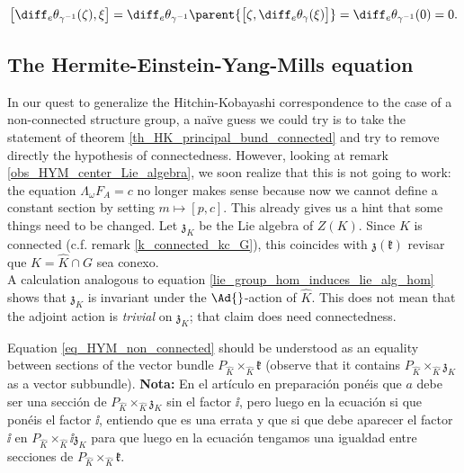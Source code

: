 {\begin{equation} \label{lie_group_hom_induces_lie_alg_hom}
    \big[\diff_e\theta_{\gamma^{-1}}(\zeta), \xi \big] = \diff_e \theta_{\gamma^{-1}} \parent{\big[\zeta, \diff_e \theta_\gamma(\xi) \big]} = \diff_e\theta_{\gamma^{-1}}(0)=0.
\end{equation}

\subsection{The Hermite-Einstein-Yang-Mills equation}
In our quest to generalize the Hitchin-Kobayashi correspondence to the case of a non-connected structure group, a naïve guess we could try is to take the statement of theorem \ref{th_HK_principal_bund_connected} and try to remove directly the hypothesis of connectedness. However, looking at remark \ref{obs_HYM_center_Lie_algebra}, we soon realize that this is not going to work: the equation \(\Lambda_\omega F_A= c\) no longer makes sense because now we cannot define a constant section by setting \(m \mapsto [p, c]\). This already gives us a hint that some things need to be changed. Let \(\mathfrak{z}_K\) be the Lie algebra of \(Z(K)\). Since \(K\) is connected (c.f. remark \ref{k_connected_kc_G}), this coincides with \(\mathfrak{z}(\mathfrak{k})\) {\color{red}revisar que \(K=\hat{K} \cap G\) sea conexo.} \\

A calculation analogous to equation \eqref{lie_group_hom_induces_lie_alg_hom} shows that \(\mathfrak{z}_K\) is invariant under the \(\Ad{}\)-action of \(\hat{K}\). This does not mean that the adjoint action is \textit{trivial} on \(\mathfrak{z}_K\); that claim does need connectedness.

Equation \eqref{eq_HYM_non_connected} should be understood as an equality between sections of the vector bundle \(P_{\hat{K}}\times_{\hat{K}}\mathfrak{k}\) (observe that it contains \(P_{\hat{K}}\times_{\hat{K}}\mathfrak{z}_K\) as a vector subbundle). {\color{red}\textbf{Nota:} En el artículo en preparación ponéis que \(a\) debe ser una sección de \(P_{\hat{K}} \times_{\hat{K}} \mathfrak{z}_K\) sin el factor \(\ii\), pero luego en la ecuación si que ponéis el factor \(\ii\), entiendo que es una errata y que si que debe aparecer el factor \(\ii\) en \(P_{\hat{K}}\times_{\hat{K}} \ii \mathfrak{z}_K\) para que luego en la ecuación tengamos una igualdad entre secciones de \(P_{\hat{K}}\times_{\hat{K}}\mathfrak{k}\).}

}
